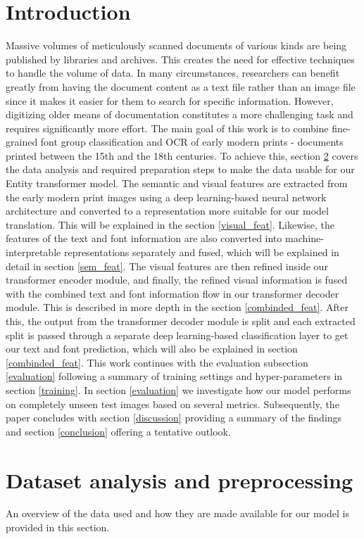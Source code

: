 \documentclass[conference]{IEEEtran}
\begin{document}
\section{Introduction}
Massive volumes of meticulously scanned documents of various kinds are being published by libraries and archives. This creates the need for effective techniques to handle the volume of data. In many circumstances, researchers can benefit greatly from having the document content as a text file rather than an image file since it makes it easier for them to search for specific information. However, digitizing older means of documentation constitutes a more challenging task and requires significantly more effort. The main goal of this work is to combine fine-grained font group classification and OCR of early modern prints - documents printed between the 15th and the 18th centuries.\newline
To achieve this, section \ref{data} covers the data analysis and required preparation steps to make the data usable for our Entity transformer model. The semantic and visual features are extracted from the early modern print images using a deep learning-based neural network architecture and converted to a representation more suitable for our model translation. This will be explained in the section \ref{visual_feat}. Likewise, the features of the text and font information are also converted into machine-interpretable representations separately and fused, which will be explained in detail in section  \ref{sem_feat}. The visual features are then refined inside our transformer encoder module, and finally, the refined visual information is fused with the combined text and font information flow in our transformer decoder module. This is described in more depth in the section \ref{combinded_feat}. After this, the output from the transformer decoder module is split and each extracted split is passed through a separate deep learning-based classification layer to get our text and font prediction, which will also be explained in section \ref{combinded_feat}. This work continues with the evaluation subsection \ref{evaluation} following a summary of training settings and hyper-parameters in section \ref{training}. In section \ref{evaluation} we investigate how our model performs on completely unseen test images based on several metrics. Subsequently, the paper concludes with section \ref{discussion} providing a summary of the findings and section \ref{conclusion} offering a tentative outlook.


\section{Dataset analysis and preprocessing}\label{data}
An overview of the data used and how they are made available for our model is provided in this section.
\end{document}
